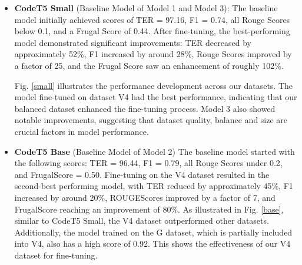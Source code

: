 \documentclass[conference]{IEEEtran}
\begin{document}
\begin{itemize}

    \item\textbf{CodeT5 Small} (Baseline Model of Model 1 and Model 3):
    The baseline model initially achieved scores of TER = 97.16, F1 = 0.74, all Rouge Scores below 0.1, and a Frugal Score of 0.44. After fine-tuning, the best-performing model demonstrated significant improvements: TER decreased by approximately 52\%, F1 increased by around 28\%, Rouge Scores improved by a factor of 25, and the Frugal Score saw an enhancement of roughly 102\%.

    Fig. \ref{small} illustrates the performance development across our datasets. The model fine-tuned on dataset V4 had the best performance, indicating that our balanced dataset enhanced the fine-tuning process. Model 3 also showed notable improvements, suggesting that dataset quality, balance and size are crucial factors in model performance.
    \item \textbf{CodeT5 Base }(Baseline Model of Model 2)
    The baseline model started with the following scores: TER = 96.44, F1 = 0.79, all Rouge Scores under 0.2, and FrugalScore = 0.50.
    Fine-tuning on the V4 dataset resulted in the second-best performing model, with TER reduced by approximately 45\%, F1 increased by around 20\%, ROUGEScores improved by a factor of 7, and FrugalScore reaching an improvement of 80\%. As illustrated in Fig. \ref{base}, similar to CodeT5 Small, the V4 dataset outperformed other datasets. Additionally, the model trained on the G dataset, which is partially included into V4, also has a high score of 0.92. This shows the effectiveness of our V4 dataset for fine-tuning. 

\end{itemize}
\end{document}
